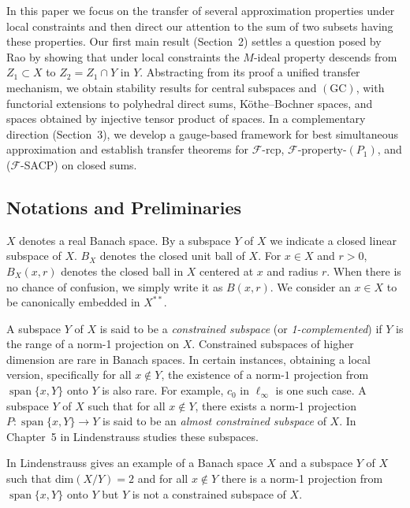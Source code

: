 \documentclass[11pt]{amsart}
\newcommand{\ra}{\rightarrow}
\newcommand{\mr}{\mathscr}
\newcommand{\iy}{\infty}
\DeclareMathOperator{\spn}{span}
\begin{document}
In this paper we focus on the transfer of several approximation properties under local constraints and then direct our attention to the sum of two subsets having these properties.
Our first main result (Section~2) settles a question posed by Rao by showing that under local constraints the $M$-ideal property descends from $Z_1\subset X$ to $Z_2=Z_1\cap Y$ in $Y$.
Abstracting from its proof a unified transfer mechanism, we obtain stability results for central subspaces and $(\mathrm{GC})$, with functorial extensions to polyhedral direct sums, K\"othe--Bochner spaces, and spaces obtained by injective tensor product of spaces.
In a complementary direction (Section~3), we develop a gauge-based framework for best simultaneous approximation and establish transfer theorems for $\mr{F}$-rcp, $\mr{F}$-property-$(P_1)$, and ($\mr{F}$-SACP) on closed sums.


\subsection{Notations and Preliminaries}

$X$ denotes a real Banach space. By a subspace $Y$ of $X$ we indicate a closed linear subspace of $X$. $B_X$ denotes the closed unit ball of $X$. For $x\in X$ and $r>0$, $B_X(x,r)$ denotes the closed ball in $X$ centered at $x$ and radius $r$. When there is no chance of confusion, we simply write it as $B(x,r)$. We consider an $x\in X$ to be canonically embedded in $X^{**}$. 

A subspace $Y$ of $X$ is said to be a {\it constrained subspace} (or {\it 1-complemented}) if $Y$ is the range of a norm-1 projection on $X$. Constrained subspaces of higher dimension are rare in Banach spaces. In certain instances, obtaining a local version, specifically for all $x\notin Y$, the existence of a norm-$1$ projection from $\spn\{x,Y\}$ onto $Y$ is also rare. For example, $c_0$ in $\ell_\iy$ is one such case. A subspace $Y$ of $X$ such that for all $x\notin Y$, there exists a norm-1 projection $P:\spn\{x,Y\}\ra Y$ is said to be an {\it almost constrained subspace} of $X$. In Chapter~5 in \cite{JL1} Lindenstrauss studies these subspaces.

In \cite{L} Lindenstrauss gives an example of a Banach space $X$ and a subspace $Y$ of $X$ such that dim$(X/Y)=2$ and for all $x\notin Y$ there is a norm-1 projection from $\spn\{x,Y\}$ onto $Y$ but $Y$ is not a constrained subspace of $X$. 
\end{document}

